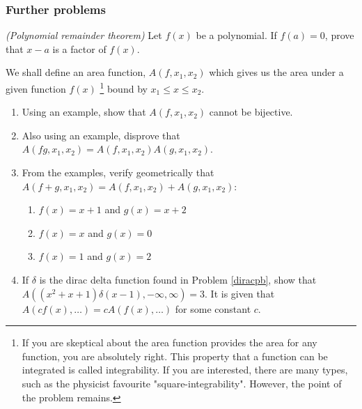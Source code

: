 \subsubsection*{Further problems}
\begin{problem}[1]
  \textit{(Polynomial remainder theorem)} Let \(f(x)\) be a polynomial. If \(f(a)=0\), prove that \(x-a\) is a factor of \(f(x)\).
\end{problem}
\begin{problem}[1]
  We shall define an area function, \(A(f,x_1,x_2)\) which gives us the area under a given function \(f(x)\) \footnote{If you are skeptical about the area function provides the area for any function, you are absolutely right. This property that a function can be integrated is called integrability. If you are interested, there are many types, such as the physicist favourite "square-integrability". However, the point of the problem remains.} bound by \(x_1\leq x\leq x_2\).
  \begin{enumerate}[label=\alph*)]
    \item{Using an example, show that \(A(f,x_1,x_2)\) cannot be bijective.}
    \item{Also using an example, disprove that \(A(fg,x_1,x_2)=A(f,x_1,x_2)A(g,x_1,x_2)\).}
    \item{From the examples, verify geometrically that \(A(f+g,x_1,x_2)=A(f,x_1,x_2)+A(g,x_1,x_2)\):
      \begin{enumerate}
        \item{\(f(x)=x+1\) and \(g(x)=x+2\)}
        \item{\(f(x)=x\) and \(g(x)=0\)}
        \item{\(f(x)=1\) and \(g(x)=2\)}
      \end{enumerate}
      }
    \item{If \(\delta\) is the dirac delta function found in Problem \ref{diracpb}, show that \(A((x^2+x+1)\delta(x-1),-\infty, \infty)=3\). It is given that \(A(cf(x),\ldots)=cA(f(x),\ldots)\) for some constant \(c\).}
  \end{enumerate}
\end{problem}
